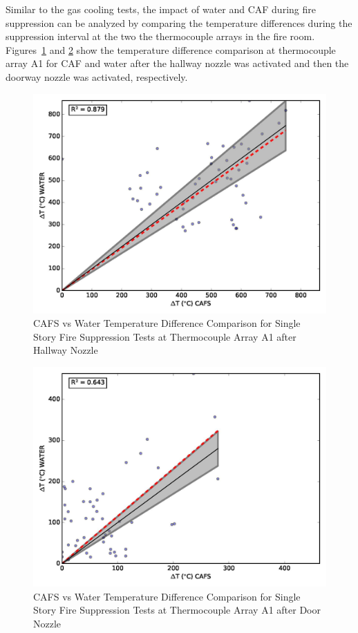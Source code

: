 \documentclass[12pt,oneside]{book}
\begin{document}
Similar to the gas cooling tests, the impact of water and CAF during fire suppression can be analyzed by comparing the temperature differences during the suppression interval at the two the thermocouple arrays in the fire room. Figures~\ref{fig:fs_hall_a1} and \ref{fig:fs_door_a1} show the temperature difference comparison at thermocouple array A1 for CAF and water after the hallway nozzle was activated and then the doorway nozzle was activated, respectively. 

\begin{figure}[!ht]
	\includegraphics[width=.7\columnwidth]{../Figures/Script_Figures/TCA1_hallnozzle_scatter}
	\caption{CAFS vs Water Temperature Difference Comparison for Single Story Fire Suppression Tests at Thermocouple Array A1 after Hallway Nozzle}
	\label{fig:fs_hall_a1}
\end{figure}

\begin{figure}[!ht]
	\includegraphics[width=.7\columnwidth]{../Figures/Script_Figures/TCA1_doornozzle_scatter}
	\caption{CAFS vs Water Temperature Difference Comparison for Single Story Fire Suppression Tests at Thermocouple Array A1 after Door Nozzle}
	\label{fig:fs_door_a1}
\end{figure}
\end{document}

